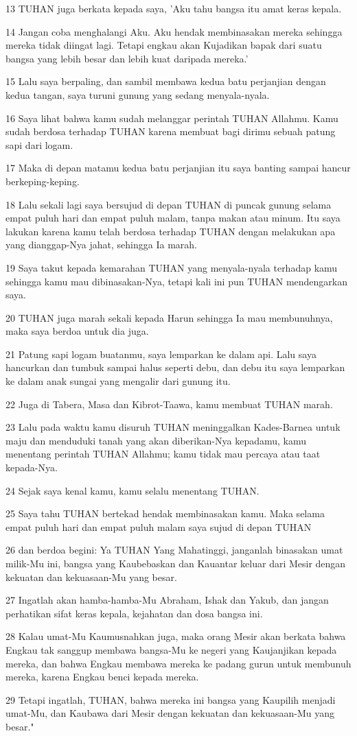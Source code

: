 \par 13 TUHAN juga berkata kepada saya, 'Aku tahu bangsa itu amat keras kepala.
\par 14 Jangan coba menghalangi Aku. Aku hendak membinasakan mereka sehingga mereka tidak diingat lagi. Tetapi engkau akan Kujadikan bapak dari suatu bangsa yang lebih besar dan lebih kuat daripada mereka.'
\par 15 Lalu saya berpaling, dan sambil membawa kedua batu perjanjian dengan kedua tangan, saya turuni gunung yang sedang menyala-nyala.
\par 16 Saya lihat bahwa kamu sudah melanggar perintah TUHAN Allahmu. Kamu sudah berdosa terhadap TUHAN karena membuat bagi dirimu sebuah patung sapi dari logam.
\par 17 Maka di depan matamu kedua batu perjanjian itu saya banting sampai hancur berkeping-keping.
\par 18 Lalu sekali lagi saya bersujud di depan TUHAN di puncak gunung selama empat puluh hari dan empat puluh malam, tanpa makan atau minum. Itu saya lakukan karena kamu telah berdosa terhadap TUHAN dengan melakukan apa yang dianggap-Nya jahat, sehingga Ia marah.
\par 19 Saya takut kepada kemarahan TUHAN yang menyala-nyala terhadap kamu sehingga kamu mau dibinasakan-Nya, tetapi kali ini pun TUHAN mendengarkan saya.
\par 20 TUHAN juga marah sekali kepada Harun sehingga Ia mau membunuhnya, maka saya berdoa untuk dia juga.
\par 21 Patung sapi logam buatanmu, saya lemparkan ke dalam api. Lalu saya hancurkan dan tumbuk sampai halus seperti debu, dan debu itu saya lemparkan ke dalam anak sungai yang mengalir dari gunung itu.
\par 22 Juga di Tabera, Masa dan Kibrot-Taawa, kamu membuat TUHAN marah.
\par 23 Lalu pada waktu kamu disuruh TUHAN meninggalkan Kades-Barnea untuk maju dan menduduki tanah yang akan diberikan-Nya kepadamu, kamu menentang perintah TUHAN Allahmu; kamu tidak mau percaya atau taat kepada-Nya.
\par 24 Sejak saya kenal kamu, kamu selalu menentang TUHAN.
\par 25 Saya tahu TUHAN bertekad hendak membinasakan kamu. Maka selama empat puluh hari dan empat puluh malam saya sujud di depan TUHAN
\par 26 dan berdoa begini: Ya TUHAN Yang Mahatinggi, janganlah binasakan umat milik-Mu ini, bangsa yang Kaubebaskan dan Kauantar keluar dari Mesir dengan kekuatan dan kekuasaan-Mu yang besar.
\par 27 Ingatlah akan hamba-hamba-Mu Abraham, Ishak dan Yakub, dan jangan perhatikan sifat keras kepala, kejahatan dan dosa bangsa ini.
\par 28 Kalau umat-Mu Kaumusnahkan juga, maka orang Mesir akan berkata bahwa Engkau tak sanggup membawa bangsa-Mu ke negeri yang Kaujanjikan kepada mereka, dan bahwa Engkau membawa mereka ke padang gurun untuk membunuh mereka, karena Engkau benci kepada mereka.
\par 29 Tetapi ingatlah, TUHAN, bahwa mereka ini bangsa yang Kaupilih menjadi umat-Mu, dan Kaubawa dari Mesir dengan kekuatan dan kekuasaan-Mu yang besar."

